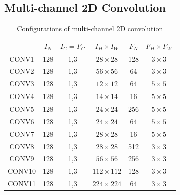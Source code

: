 \subsection{Multi-channel 2D Convolution}
\label{3dconvexp}

\begin{table}[]
\caption{Configurations of multi-channel 2D convolution}
\label{tab:3dconvconfigs}
\begin{tabular}{c|ccccc}
\hline
& $I_N$ & $I_C=F_C$ & $I_H \times I_W$ & $F_N$ & $F_H \times F_W$ \\
\hline
CONV1 & 128  & 1,3       & $28\times 28$     & 128  & $3\times 3$       \\
CONV2 & 128  & 1,3       & $56\times 56$     & 64   & $3\times 3$       \\
CONV3 & 128  & 1,3       & $12\times 12$     & 64   & $5\times 5$       \\
CONV4 & 128  & 1,3       & $14\times 14$     & 16   & $5 \times 5$       \\
CONV5 & 128  & 1,3       & $24\times 24$    & 256  & $5 \times 5$       \\
CONV6 & 128  & 1,3       & $24\times 24$     & 64   & $5\times 5$       \\
CONV7 & 128  & 1,3       & $28\times 28$     & 16   & $5\times 5$       \\
CONV8 & 128  & 1,3       & $28\times 28$     & 512   & $3\times 3$       \\
CONV9 & 128  & 1,3       & $56\times 56$     & 256  & $3\times 3$       \\
CONV10 & 128  & 1,3       & $112\times 112$     & 128   & $3\times 3$       \\
CONV11 &128  & 1,3       & $224\times 224$     & 64   & $3\times 3$      \\
\hline
\end{tabular}
\end{table}

